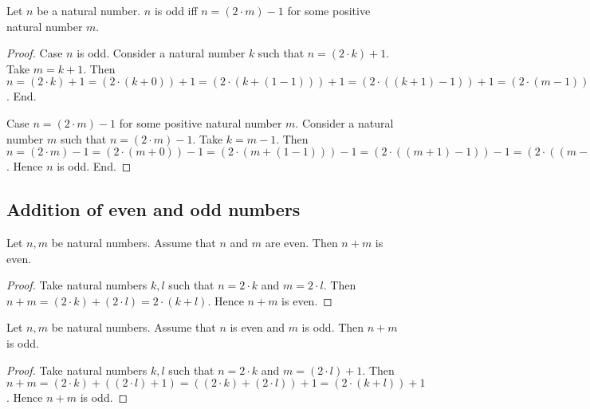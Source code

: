 \documentclass[10pt]{article}
\begin{document}
  \begin{forthel}
    \begin{proposition}
      Let $n$ be a natural number.
      $n$ is odd iff $n = (2 \cdot m) - 1$ for some positive natural number $m$.
    \end{proposition}
    \begin{proof}
      Case $n$ is odd.
        Consider a natural number $k$ such that $n = (2 \cdot k) + 1$.
        Take $m = k + 1$.
        Then $n =
        (2 \cdot k) + 1 =
        (2 \cdot (k + 0)) + 1 =
        (2 \cdot (k + (1 - 1))) + 1 =
        (2 \cdot ((k + 1) - 1)) + 1 =
        (2 \cdot (m - 1)) + 1 =
        ((2 \cdot m) - (2 \cdot 1)) + 1 =
        ((2 \cdot m) - 2) + 1 =
        (2 \cdot m) - 1$.
      End.

      Case $n = (2 \cdot m) - 1$ for some positive natural number $m$.
        Consider a natural number $m$ such that $n = (2 \cdot m) - 1$.
        Take $k = m - 1$.
        Then $n =
        (2 \cdot m) - 1 =
        (2 \cdot (m + 0)) - 1 =
        (2 \cdot (m + (1 - 1))) - 1 =
        (2 \cdot ((m + 1) - 1)) - 1 =
        (2 \cdot ((m - 1) + 1)) - 1 =
        (2 \cdot (k + 1)) - 1 =
        ((2 \cdot k) + (2 \cdot 1)) - 1 =
        ((2 \cdot k) + 2) - 1 =
        (2 \cdot k) + (2 - 1) =
        (2 \cdot k) + 1$.
        Hence $n$ is odd.
      End.
    \end{proof}
  \end{forthel}


  \subsection{Addition of even and odd numbers}

  \begin{forthel}
    \begin{proposition}
      Let $n, m$ be natural numbers.
      Assume that $n$ and $m$ are even.
      Then $n + m$ is even.
    \end{proposition}
    \begin{proof}
      Take natural numbers $k, l$ such that $n = 2 \cdot k$ and $m = 2 \cdot l$.
      Then $n + m =
      (2 \cdot k) + (2 \cdot l) =
      2 \cdot (k + l)$.
      Hence $n + m$ is even.
    \end{proof}
  \end{forthel}

  \begin{forthel}
    \begin{proposition}
      Let $n, m$ be natural numbers.
      Assume that $n$ is even and $m$ is odd.
      Then $n + m$ is odd.
    \end{proposition}
    \begin{proof}
      Take natural numbers $k, l$ such that $n = 2 \cdot k$ and $m = (2 \cdot l) + 1$.
      Then $n + m =
      (2 \cdot k) + ((2 \cdot l) + 1) =
      ((2 \cdot k) + (2 \cdot l)) + 1 =
      (2 \cdot (k + l)) + 1$.
      Hence $n + m$ is odd.
    \end{proof}
  \end{forthel}
\end{document}
